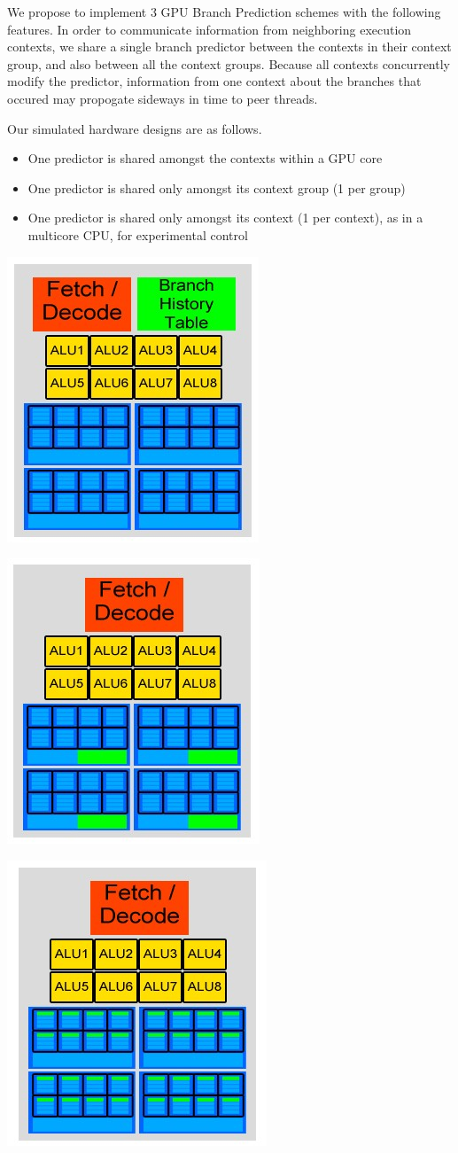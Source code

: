 \documentclass[conference]{IEEEtran}
\begin{document}
We propose to implement 3 GPU Branch Prediction schemes with the following features.  In order to communicate information from neighboring 
execution contexts, we share a single branch predictor between the contexts in their context group, and also between all the context groups.  Because
all contexts concurrently modify the predictor, information from one context about the branches that occured may propogate sideways in time to peer threads.

Our simulated hardware designs are as follows.
\begin{itemize}
	\item One predictor is shared amongst the contexts within a GPU core
	\item One predictor is shared only amongst its context group (1 per group)
	\item One predictor is shared only amongst its context (1 per context), as in a multicore CPU, for experimental control
\end{itemize}

\begin{center}
	\includegraphics[width=.2\textwidth]{Our-GPU---per-core-predictor.jpg}
\end{center}

\begin{center}
	\includegraphics[width=.2\textwidth]{Our-GPU---per-context-group-predictor.jpg}
\end{center}

\begin{center}
	\includegraphics[width=.2\textwidth]{Our-GPU---per-element-predictor.jpg}
\end{center}
\end{document}
